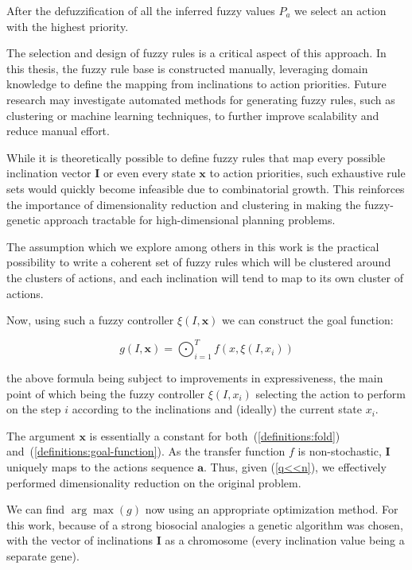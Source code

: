 \documentclass[12pt, a4paper]{report}
\begin{document}
	After the defuzzification of all the inferred fuzzy values $P_a$ we select an action with the highest priority.
	
	The selection and design of fuzzy rules is a critical aspect of this approach.
	In this thesis, the fuzzy rule base is constructed manually, leveraging domain knowledge to define the mapping from inclinations to action priorities.
	Future research may investigate automated methods for generating fuzzy rules, such as clustering or machine learning techniques, to further improve scalability and reduce manual effort.

	While it is theoretically possible to define fuzzy rules that map every possible inclination vector $\mathbf{I}$ or even every state $\mathbf{x}$ to action priorities, such exhaustive rule sets would quickly become infeasible due to combinatorial growth.
	This reinforces the importance of dimensionality reduction and clustering in making the fuzzy-genetic approach tractable for high-dimensional planning problems.

	The assumption which we explore among others in this work is the practical possibility to write a coherent set of fuzzy rules which will be clustered around the clusters of actions, and each inclination will tend to map to its own cluster of actions.
	
	Now, using such a fuzzy controller $\xi(I, \mathbf{x})$ we can construct the goal function:
	
	\begin{equation}\label{definitions:goal-function}
		g(I, \mathbf{x}) = \bigodot_{i=1}^{T} f(x, \xi(I, x_i))
	\end{equation}
	
	the above formula being subject to improvements in expressiveness,
	the main point of which being the fuzzy controller $\xi(I, x_i)$ selecting the action to perform on the step $i$ according to the inclinations and (ideally) the current state $x_i$.
	
	The argument $\mathbf{x}$ is essentially a constant for both~(\ref{definitions:fold}) and~(\ref{definitions:goal-function}).
	As the transfer function $f$ is non-stochastic, $\mathbf{I}$ uniquely maps to the actions sequence $\mathbf{a}$.
	Thus, given (\ref{q<<n}), we effectively performed dimensionality reduction on the original problem.
		
	We can find $\arg \max(g)$ now using an appropriate optimization method.
	For this work, because of a strong biosocial analogies a genetic algorithm\cite{mitchell1999geneticalgorithms} was chosen,
	with the vector of inclinations $\mathbf{I}$ as a chromosome (every inclination value being a separate gene).
	
\end{document}
